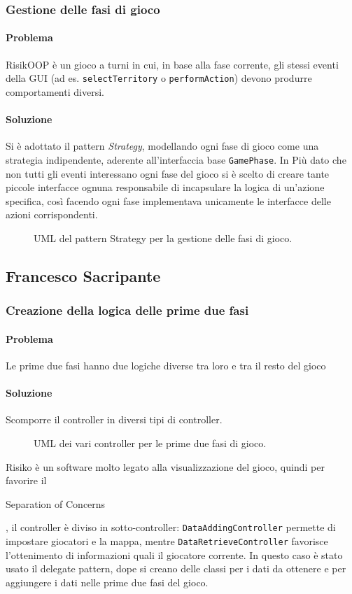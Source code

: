 \documentclass[a4paper,12pt]{report}
\begin{document}
\subsubsection{Gestione delle fasi di gioco}
\paragraph{Problema}
RisikOOP è un gioco a turni in cui, in base alla fase corrente, gli stessi eventi della GUI (ad es. \texttt{selectTerritory} o \texttt{performAction}) devono produrre comportamenti diversi.
\paragraph{Soluzione}
Si è adottato il pattern \textit{Strategy}, modellando ogni fase di gioco come una strategia indipendente, aderente all'interfaccia base \texttt{GamePhase}.
In Più dato che non tutti gli eventi interessano ogni fase del gioco si è scelto di creare tante piccole interfacce ognuna responsabile di incapsulare la logica di un'azione specifica, così facendo ogni fase implementava unicamente le interfacce delle azioni corrispondenti.
\begin{figure}[H]
	\centering
	
	\caption{UML del pattern Strategy per la gestione delle fasi di gioco.}
\end{figure}
\subsection{Francesco Sacripante}
\subsubsection{Creazione della logica delle prime due fasi}
\paragraph{Problema}
Le prime due fasi hanno due logiche diverse tra loro e tra il resto del gioco
\paragraph{Soluzione}
Scomporre il controller in diversi tipi di controller.
\begin{figure}[H]
	\centering
	
	\caption{UML dei vari controller per le prime due fasi di gioco.}
\end{figure}
Risiko è un software molto legato alla visualizzazione del gioco, quindi per favorire il \begin{itshape}Separation of Concerns\end{itshape}, il controller è diviso in sotto-controller: \texttt{DataAddingController} permette di impostare giocatori e la mappa, mentre \texttt{DataRetrieveController} favorisce l'ottenimento di informazioni quali il giocatore corrente.
In questo caso è stato usato il delegate pattern, dope si creano delle classi per i dati da ottenere e per aggiungere i dati nelle prime due fasi del gioco.
\end{document}
